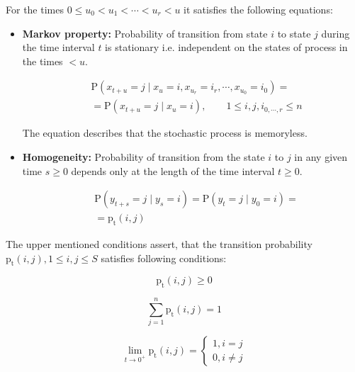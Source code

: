 \documentclass[thesis=M,english]{FITthesis}[2012/10/20]
\begin{document}
For the times $0 \leq u_0 < u_1 < \cdots < u_r < u$ it satisfies the following equations: 
\begin{itemize}
\item \textbf{Markov property:} Probability of transition from state $i$ to state $j$ during the time interval $t$ is stationary i.e. independent on the states of process in the times $< u$.  
    
\begin{equation}
\begin{aligned}
& \mathrm{P}( x_{t+u} = j \mid x_u = i, x_{u_r} = i_r, \cdots , x_{u_0} = i_0 ) = \\ 
& = \mathrm{P}( x_{t+u} = j \mid x_u = i ), \qquad 1 \leq i,j,i_{0,\cdots,r} \leq n 
\end{aligned}
\end{equation}

The equation describes that the stochastic process is memoryless.

\item \textbf{Homogeneity:} Probability of transition from the state $i$ to $j$ in any given time $s \geq 0$ depends only at the length of the time interval $t \geq 0$. 

\begin{equation}
\begin{aligned}
& \mathrm{P}( y_{t+s} = j \mid y_s = i ) = \mathrm{P}( y_t = j \mid y_0 = i ) = \\
& = \mathrm{p_t}(i,j)
\end{aligned}
\end{equation}

\end{itemize}
 

The upper mentioned conditions assert, that the transition probability $\mathrm{p_t}(i,j), 1 \leq i,j \leq S$ satisfies following conditions:%


\begin{equation}
\mathrm{p_t}(i,j) \geq 0
\end{equation}

\begin{equation}
\sum_{j = 1}^n \mathrm{p_t}(i,j) = 1
\end{equation}

\begin{equation}\label{eq:l0}  
\lim_{t \to 0^+} \mathrm{p_t}(i,j)= 
\begin{cases}
1, i = j\\
0, i \neq j
\end{cases}
\end{equation}
\end{document}
